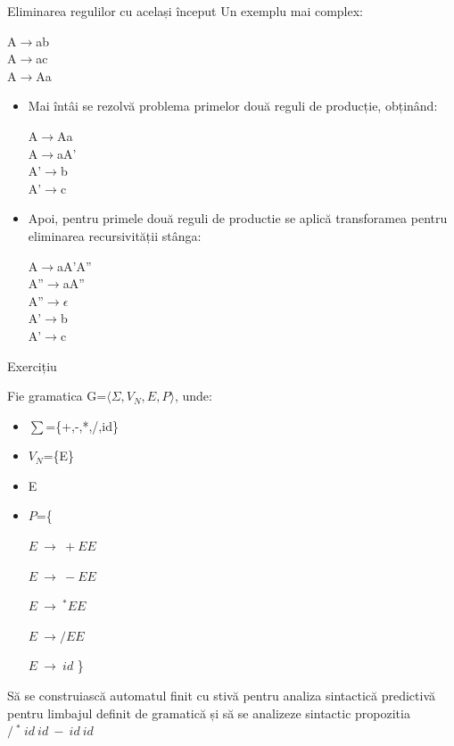 \documentclass[pdf]{beamer}
\begin{document}
\begin{frame}{Eliminarea regulilor cu același început}
Un exemplu mai complex:

A$\rightarrow$ab\\
A$\rightarrow$ac\\
A$\rightarrow$Aa\\

\begin{itemize}
\item
Mai întâi se rezolvă problema primelor două reguli de producție, obținând:

A$\rightarrow$Aa\\
A$\rightarrow$aA'\\
A'$\rightarrow$b\\
A'$\rightarrow$c\\

\item
Apoi, pentru primele două reguli de productie se aplică transforamea pentru eliminarea recursivității stânga:

A$\rightarrow$aA'A''\\
A''$\rightarrow$aA''\\
A''$\rightarrow \epsilon$\\
A'$\rightarrow$b\\
A'$\rightarrow$c\\
\end{itemize}
\end{frame}



\begin{frame}{Exercițiu}

Fie gramatica G=$\langle \Sigma, V_N, E, P \rangle$, unde:

\begin{itemize}
\item
$\sum$=\{+,-,*,/,id\}
\item
$V_N$=\{E\}
\item
E
\item
$P$=\{

\hspace{1cm} $E \ \rightarrow \ +EE$ 

\hspace{1cm} $E \ \rightarrow \ -EE$

\hspace{1cm} $E \ \rightarrow \ ^{*}EE$ 

\hspace{1cm} $E \ \rightarrow  /EE$

\hspace{1cm} $E \ \rightarrow \ id$
\}
\end{itemize}

Să se construiască automatul finit cu stivă pentru analiza sintactică predictivă pentru limbajul definit de gramatică și să se analizeze sintactic propozitia $/ \ ^{*} \ id \ id \ - \ id \ id$
\end{frame}
\end{document}
